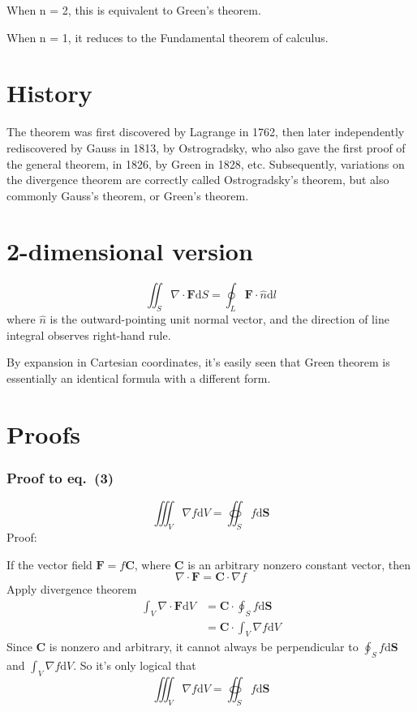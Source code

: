 \documentclass[a4paper]{article}
\begin{document}
When n = 2, this is equivalent to Green's theorem.

When n = 1, it reduces to the Fundamental theorem of calculus.
\part{History}
The theorem was first discovered by Lagrange in 1762, then later independently rediscovered by Gauss in 1813, by Ostrogradsky, who also gave the first proof of the general theorem, in 1826, by Green in 1828, etc. Subsequently, variations on the divergence theorem are correctly called Ostrogradsky's theorem, but also commonly Gauss's theorem, or Green's theorem.
\part{2-dimensional version}
\begin{equation}
\iint_S \nabla\cdot\bm{F}\mathrm{d}S=\oint_L \bm{F}\cdot\hat{n}\mathrm{d}l
\end{equation}
where $\hat{n}$ is the outward-pointing unit normal vector, and the direction of line integral observes right-hand rule.

By expansion in Cartesian coordinates, it's easily seen that Green theorem is essentially an identical formula with a different form.
\part{Proofs}
\section{Proof to eq.~(3)}
\[
\iiint_V \nabla f \mathrm{d}V=\oiint_S f\mathrm{d}\boldsymbol{S}
\]
\hypertarget{proof1}{Proof}:

If the vector field $\mathbf{F}=f\mathbf{C}$, where $\mathbf{C}$ is an arbitrary nonzero constant vector, then 
\[
\nabla\cdot\boldsymbol{F}=\boldsymbol{C}\cdot\nabla f
\]
Apply divergence theorem
\begin{align*}
\int_V \nabla\cdot\boldsymbol{F}\mathrm{d}V
&=\boldsymbol{C}\cdot\oint_S f\mathrm{d}\boldsymbol{S}\\
&=\boldsymbol{C}\cdot\int_V \nabla f\mathrm{d}V
\end{align*}
Since \textbf{C} is nonzero and arbitrary, it cannot always be perpendicular to $\oint_S f\mathrm{d}\boldsymbol{S}$ and $\int_V \nabla f\mathrm{d}V$. So it's only logical that
\[
\iiint_V \nabla f \mathrm{d}V=\oiint_S f\mathrm{d}\boldsymbol{S}
\]
\end{document}
